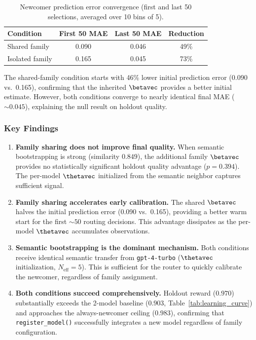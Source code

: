 \begin{table}[h]
\centering
\caption{Newcomer prediction error convergence (first and last 50
selections, averaged over 10 bins of 5).}
\label{tab:pred_error_convergence}
\small
\begin{tabular}{@{}lccc@{}}
\toprule
\textbf{Condition} & \textbf{First 50 MAE} & \textbf{Last 50 MAE}
  & \textbf{Reduction} \\
\midrule
Shared family   & 0.090 & 0.046 & 49\% \\
Isolated family & 0.165 & 0.045 & 73\% \\
\bottomrule
\end{tabular}
\end{table}

The shared-family condition starts with 46\% lower initial prediction
error (0.090 vs.\ 0.165), confirming that the inherited $\betavec$
provides a better initial estimate.  However, both conditions converge
to nearly identical final MAE (${\sim}0.045$), explaining the null
result on holdout quality.

\subsubsection{Key Findings}

\begin{enumerate}[nosep]
    \item \textbf{Family sharing does not improve final quality.}
          When semantic bootstrapping is strong (similarity $0.849$),
          the additional family $\betavec$ provides no statistically
          significant holdout quality advantage ($p{=}0.394$).
          The per-model $\thetavec$ initialized from the semantic
          neighbor captures sufficient signal.
    \item \textbf{Family sharing accelerates early calibration.}
          The shared $\betavec$ halves the initial prediction error
          (0.090 vs.\ 0.165), providing a better warm start for the
          first ${\sim}50$ routing decisions.  This advantage dissipates
          as the per-model $\thetavec$ accumulates observations.
    \item \textbf{Semantic bootstrapping is the dominant mechanism.}
          Both conditions receive identical semantic transfer from
          \texttt{gpt-4-turbo} ($\thetavec$ initialization,
          $N_{\text{eff}}{=}5$).  This is sufficient for the router to
          quickly calibrate the newcomer, regardless of family assignment.
    \item \textbf{Both conditions succeed comprehensively.}
          Holdout reward ($0.970$) substantially exceeds the 2-model
          baseline ($0.903$, Table~\ref{tab:learning_curve}) and
          approaches the always-newcomer ceiling ($0.983$),
          confirming that \texttt{register\_model()} successfully
          integrates a new model regardless of family configuration.
\end{enumerate}

